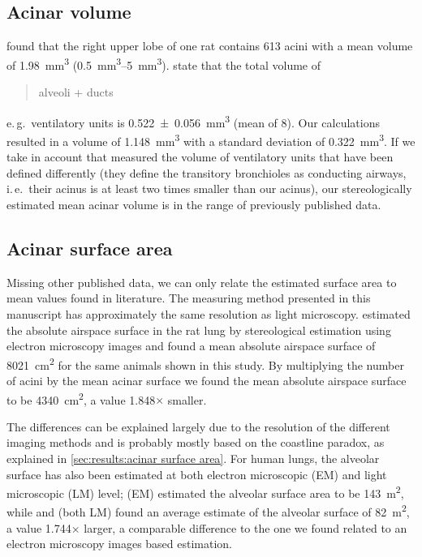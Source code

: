 \documentclass[a4paper,DIV=calc,abstract,english]{scrartcl}
\newcommand{\ie}{i.\,e.\ }
\newcommand{\eg}{e.\,g.\ }
\newcommand{\meanacinarvolume}{1.148} %
\newcommand{\meanacinarvolumeSTD}{0.322} %
\newcommand{\meanairspacesurface}{4340} %
\newcommand{\airspacedifference}{1.848} %
\begin{document}
\subsection{Acinar volume}
\citet{Rodriguez1987} found that the right upper lobe of one rat contains 613 acini with a mean volume of \SI{1.98}{\milli\meter\cubed} (\SIrange{0.5}{5}{\milli\meter\cubed}).
\citet{Mercer1987a} state that the total volume of \blockquote{alveoli + ducts} \eg ventilatory units is \SI{0.522(56)}{\milli\meter\cubed} (mean of 8). %
Our calculations resulted in a volume of \SI{\meanacinarvolume}{\milli\meter\cubed} with a standard deviation of \SI{\meanacinarvolumeSTD}{\milli\meter\cubed}.
If we take in account that \cite{Mercer1987a} measured the volume of ventilatory units that have been defined differently (they define the transitory bronchioles as conducting airways, \ie their acinus is at least two times smaller than our acinus), our stereologically estimated mean acinar volume is in the range of previously published data.

\subsection{Acinar surface area}
Missing other published data, we can only relate the estimated surface area to mean values found in literature.
The measuring method presented in this manuscript has approximately the same resolution as light microscopy.
\citet{Tschanz2003} estimated the absolute airspace surface in the rat lung by stereological estimation using electron microscopy images and found a mean absolute airspace surface of \SI{8021}{\centi\meter\squared} for the same animals shown in this study.
By multiplying the number of acini by the mean acinar surface we found the mean absolute airspace surface to be \SI{\meanairspacesurface}{\centi\meter\squared}, a value \airspacedifference\(\times\) smaller.

The differences can be explained largely due to the resolution of the different imaging methods and is probably mostly based on the coastline paradox, as explained in \autoref{sec:results:acinar surface area}.
For human lungs, the alveolar surface has also been estimated at both electron microscopic (EM) and light microscopic (LM) level; \citet{Gehr1978} (EM) estimated the alveolar surface area to be \SI{143}{\square\meter}, while \citet{Weibel1963} and \citet{Thurlbeck1967} (both LM) found an average estimate of the alveolar surface of \SI{82}{\square\meter}, a value 1.744\(\times\) larger, a comparable difference to the one we found related to an electron microscopy images based estimation.
\end{document}

